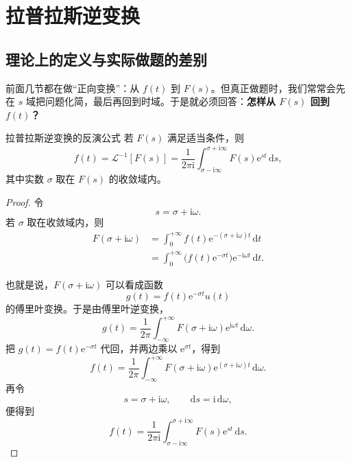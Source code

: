 \section{拉普拉斯逆变换}

\subsection{理论上的定义与实际做题的差别}

前面几节都在做``正向变换''：从 $f(t)$ 到 $F(s)$。但真正做题时，我们常常会先在 $s$ 域把问题化简，最后再回到时域。于是就必须回答：\textbf{怎样从 $F(s)$ 回到 $f(t)$？}

\begin{dingli}{拉普拉斯逆变换的反演公式}{}
若 $F(s)$ 满足适当条件，则
\[
    f(t)=\mathcal{L}^{-1}[F(s)]
    =
    \frac{1}{2\pi\mathrm{i}}
    \int_{\sigma-\mathrm{i}\infty}^{\sigma+\mathrm{i}\infty}
    F(s)\mathrm{e}^{st}\,\mathrm{d}s,
\]
其中实数 $\sigma$ 取在 $F(s)$ 的收敛域内。
\end{dingli}

\begin{proof}
令
\[
    s=\sigma+\mathrm{i}\omega.
\]
若 $\sigma$ 取在收敛域内，则
\begin{align}
    F(\sigma+\mathrm{i}\omega)
    &=
    \int_0^{+\infty}
    f(t)\mathrm{e}^{-(\sigma+\mathrm{i}\omega)t}\,\mathrm{d}t \\
    &=
    \int_0^{+\infty}
    \bigl(f(t)\mathrm{e}^{-\sigma t}\bigr)\mathrm{e}^{-\mathrm{i}\omega t}\,\mathrm{d}t.
\end{align}

也就是说，$F(\sigma+\mathrm{i}\omega)$ 可以看成函数
\[
    g(t)=f(t)\mathrm{e}^{-\sigma t}u(t)
\]
的傅里叶变换。于是由傅里叶逆变换，
\[
    g(t)
    =
    \frac{1}{2\pi}
    \int_{-\infty}^{+\infty}
    F(\sigma+\mathrm{i}\omega)\mathrm{e}^{\mathrm{i}\omega t}\,\mathrm{d}\omega.
\]
把 $g(t)=f(t)\mathrm{e}^{-\sigma t}$ 代回，并两边乘以 $\mathrm{e}^{\sigma t}$，得到
\[
    f(t)
    =
    \frac{1}{2\pi}
    \int_{-\infty}^{+\infty}
    F(\sigma+\mathrm{i}\omega)\mathrm{e}^{(\sigma+\mathrm{i}\omega)t}\,\mathrm{d}\omega.
\]
再令
\[
    s=\sigma+\mathrm{i}\omega,
    \qquad
    \mathrm{d}s=\mathrm{i}\,\mathrm{d}\omega,
\]
便得到
\[
    f(t)
    =
    \frac{1}{2\pi\mathrm{i}}
    \int_{\sigma-\mathrm{i}\infty}^{\sigma+\mathrm{i}\infty}
    F(s)\mathrm{e}^{st}\,\mathrm{d}s.
\]
\end{proof}

